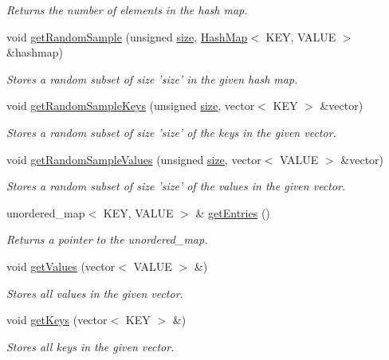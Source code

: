 \begin{DoxyCompactItemize}
\begin{DoxyCompactList}\small\item\em Returns the number of elements in the hash map. \end{DoxyCompactList}\item 
void \hyperlink{class_hash_map_a48a73346ed336eaaabbc23ac610b67a1}{get\+Random\+Sample} (unsigned \hyperlink{class_hash_map_ae29dc2b5b58f05690e455a51aeb7341d}{size}, \hyperlink{class_hash_map}{Hash\+Map}$<$ K\+E\+Y, V\+A\+L\+U\+E $>$ \&hashmap)
\begin{DoxyCompactList}\small\item\em Stores a random subset of size 'size' in the given hash map. \end{DoxyCompactList}\item 
void \hyperlink{class_hash_map_a8d0dade42862374087389ca082025165}{get\+Random\+Sample\+Keys} (unsigned \hyperlink{class_hash_map_ae29dc2b5b58f05690e455a51aeb7341d}{size}, vector$<$ K\+E\+Y $>$ \&vector)
\begin{DoxyCompactList}\small\item\em Stores a random subset of size 'size' of the keys in the given vector. \end{DoxyCompactList}\item 
void \hyperlink{class_hash_map_a8babe9098191e29b4fb10f1b8f1427d5}{get\+Random\+Sample\+Values} (unsigned \hyperlink{class_hash_map_ae29dc2b5b58f05690e455a51aeb7341d}{size}, vector$<$ V\+A\+L\+U\+E $>$ \&vector)
\begin{DoxyCompactList}\small\item\em Stores a random subset of size 'size' of the values in the given vector. \end{DoxyCompactList}\item 
\hypertarget{class_hash_map_a68db9203d908598b70b8325194c54819}{}unordered\+\_\+map$<$ K\+E\+Y, V\+A\+L\+U\+E $>$ \& \hyperlink{class_hash_map_a68db9203d908598b70b8325194c54819}{get\+Entries} ()\label{class_hash_map_a68db9203d908598b70b8325194c54819}

\begin{DoxyCompactList}\small\item\em Returns a pointer to the unordered\+\_\+map. \end{DoxyCompactList}\item 
void \hyperlink{class_hash_map_abc87b6932fa1319156a3d5fa9c46a446}{get\+Values} (vector$<$ V\+A\+L\+U\+E $>$ \&)
\begin{DoxyCompactList}\small\item\em Stores all values in the given vector. \end{DoxyCompactList}\item 
\hypertarget{class_hash_map_ab7f911839bbe21bf582a8b69c9f500d1}{}void \hyperlink{class_hash_map_ab7f911839bbe21bf582a8b69c9f500d1}{get\+Keys} (vector$<$ K\+E\+Y $>$ \&)\label{class_hash_map_ab7f911839bbe21bf582a8b69c9f500d1}

\begin{DoxyCompactList}\small\item\em Stores all keys in the given vector. \end{DoxyCompactList}\end{DoxyCompactItemize}
